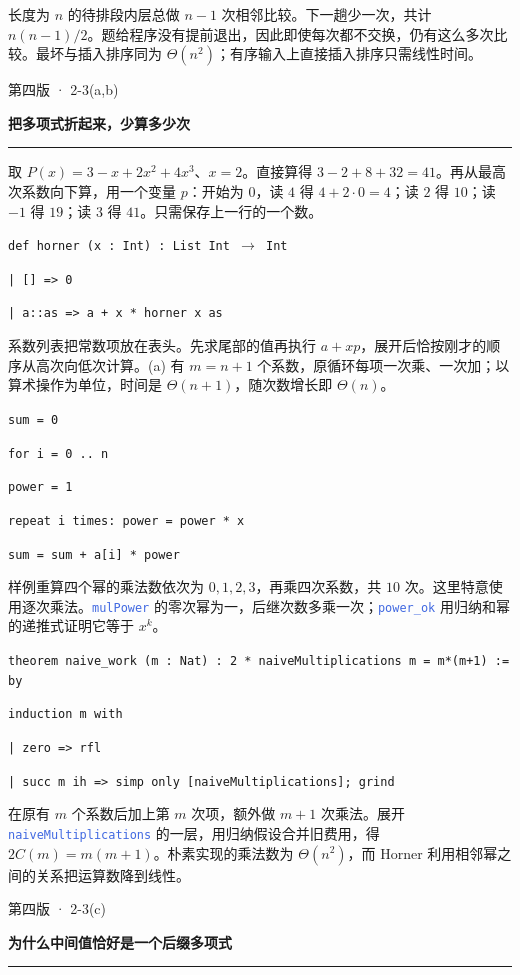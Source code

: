 \documentclass[UTF8,11pt,a4paper,fontset=fandol]{ctexart}
\newcommand{\HandoutLesson}[2]{%
  \par{\small\heiti\color{BrickRed}#1}\par\vspace{3pt}
  {\fontsize{21}{27}\selectfont\heiti\bfseries #2}\par
  \textcolor{BrickRed}{\rule{\linewidth}{.7pt}}\par}
\newcommand{\src}[1]{\textcolor{RoyalBlue}{\texttt{#1}}}
\newcommand{\subhead}[1]{\par\vspace{3pt}{\heiti\bfseries\color{RoyalBlue}#1}\par}
\newenvironment{leanblock}{\par\smallskip\noindent\begin{lrbox}{\leanbox}\begin{minipage}{\dimexpr\linewidth-12pt\relax}\raggedright\small\setlength{\parskip}{0pt}}{\end{minipage}\end{lrbox}\colorbox{RoyalBlue!6}{\usebox{\leanbox}}\par\smallskip}
\newcommand{\lineofcode}[2]{\noindent\hspace*{#1em}\strut\texttt{#2}\par}
\begin{document}
\subhead{(d) 时间}
长度为 $n$ 的待排段内层总做 $n-1$ 次相邻比较。下一趟少一次，共计 $n(n-1)/2$。题给程序没有提前退出，因此即使每次都不交换，仍有这么多次比较。最坏与插入排序同为 $\Theta(n^2)$；有序输入上直接插入排序只需线性时间。
\par{}
\clearpage{}\label{p45}\HandoutLesson{第四版 · 2-3(a,b)}{把多项式折起来，少算多少次}
取 $P(x)=3-x+2x^2+4x^3$、$x=2$。直接算得 $3-2+8+32=41$。再从最高次系数向下算，用一个变量 $p$：开始为 $0$，读 $4$ 得 $4+2\cdot0=4$；读 $2$ 得 $10$；读 $-1$ 得 $19$；读 $3$ 得 $41$。只需保存上一行的一个数。
\begin{leanblock}
\lineofcode{0.0}{def horner (x : Int) : List Int \ensuremath{\to} Int}
\lineofcode{0.9}{| [] => 0}
\lineofcode{0.9}{| a::as => a + x * horner x as}
\end{leanblock}
系数列表把常数项放在表头。先求尾部的值再执行 $a+xp$，展开后恰按刚才的顺序从高次向低次计算。(a) 有 $m=n+1$ 个系数，原循环每项一次乘、一次加；以算术操作为单位，时间是 $\Theta(n+1)$，随次数增长即 $\Theta(n)$。
\subhead{(b) 每一项重新算幂}
\begin{leanblock}
\lineofcode{0.0}{sum = 0}
\lineofcode{0.0}{for i = 0 .. n}
\lineofcode{0.9}{power = 1}
\lineofcode{0.9}{repeat i times: power = power * x}
\lineofcode{0.9}{sum = sum + a[i] * power}
\end{leanblock}
样例重算四个幂的乘法数依次为 $0,1,2,3$，再乘四次系数，共 $10$ 次。这里特意使用逐次乘法。\src{mulPower} 的零次幂为一，后继次数多乘一次；\src{power\_ok} 用归纳和幂的递推式证明它等于 $x^k$。
\begin{leanblock}
\lineofcode{0.0}{theorem naive\_work (m : Nat) : 2 * naiveMultiplications m = m*(m+1) := by}
\lineofcode{0.9}{induction m with}
\lineofcode{0.9}{| zero => rfl}
\lineofcode{0.9}{| succ m ih => simp only [naiveMultiplications]; grind}
\end{leanblock}
在原有 $m$ 个系数后加上第 $m$ 次项，额外做 $m+1$ 次乘法。展开 \src{naiveMultiplications} 的一层，用归纳假设合并旧费用，得 $2C(m)=m(m+1)$。朴素实现的乘法数为 $\Theta(n^2)$，而 Horner 利用相邻幂之间的关系把运算数降到线性。
\par{}
\clearpage{}\label{p46}\HandoutLesson{第四版 · 2-3(c)}{为什么中间值恰好是一个后缀多项式}
\end{document}
